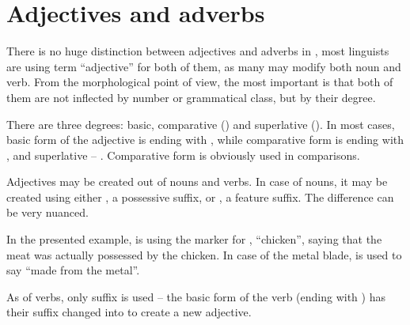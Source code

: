 


\section{Adjectives and adverbs}

There is no huge distinction between adjectives and adverbs in \andro, most
linguists are using term ``adjective'' for both of them, as many may modify both
noun and verb. From the morphological point of view, the most important is that
both of them are not inflected by number or grammatical class, but by their
degree.

There are three degrees: basic, comparative (\Comp{}) and superlative (\Supl{}).
In most cases, basic form of the adjective is ending with , while
comparative form is ending with , and superlative -- .
Comparative form is obviously used in comparisons.


Adjectives may be created out of nouns and verbs. In case of nouns, it may be
created using either , a possessive suffix, or , a feature
suffix. The difference can be very nuanced.



In the presented example,  is using the  marker for
, ``chicken'', saying that the meat was actually possessed by the
chicken. In case of the metal blade,  is used to say ``made from
the metal''.

As of verbs, only  suffix is used -- the basic form of the verb (ending
with ) has their suffix changed into  to create a new adjective.


